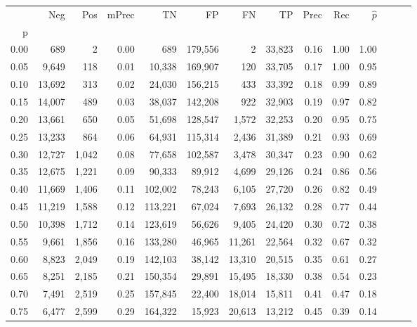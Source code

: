 \begin{tabular}{rrrrrrrrrrrrrr}
\toprule
{} &     Neg &    Pos & mPrec &       TN &       FP &      FN &      TP &  Prec &   Rec & $\hat{p}$ \\
p    &         &        &       &          &          &         &         &       &       &           \\
\midrule
0.00 &     689 &      2 &  0.00 &      689 &  179,556 &       2 &  33,823 &  0.16 &  1.00 &      1.00 \\
0.05 &   9,649 &    118 &  0.01 &   10,338 &  169,907 &     120 &  33,705 &  0.17 &  1.00 &      0.95 \\
0.10 &  13,692 &    313 &  0.02 &   24,030 &  156,215 &     433 &  33,392 &  0.18 &  0.99 &      0.89 \\
0.15 &  14,007 &    489 &  0.03 &   38,037 &  142,208 &     922 &  32,903 &  0.19 &  0.97 &      0.82 \\
0.20 &  13,661 &    650 &  0.05 &   51,698 &  128,547 &   1,572 &  32,253 &  0.20 &  0.95 &      0.75 \\
0.25 &  13,233 &    864 &  0.06 &   64,931 &  115,314 &   2,436 &  31,389 &  0.21 &  0.93 &      0.69 \\
0.30 &  12,727 &  1,042 &  0.08 &   77,658 &  102,587 &   3,478 &  30,347 &  0.23 &  0.90 &      0.62 \\
0.35 &  12,675 &  1,221 &  0.09 &   90,333 &   89,912 &   4,699 &  29,126 &  0.24 &  0.86 &      0.56 \\
0.40 &  11,669 &  1,406 &  0.11 &  102,002 &   78,243 &   6,105 &  27,720 &  0.26 &  0.82 &      0.49 \\
0.45 &  11,219 &  1,588 &  0.12 &  113,221 &   67,024 &   7,693 &  26,132 &  0.28 &  0.77 &      0.44 \\
0.50 &  10,398 &  1,712 &  0.14 &  123,619 &   56,626 &   9,405 &  24,420 &  0.30 &  0.72 &      0.38 \\
0.55 &   9,661 &  1,856 &  0.16 &  133,280 &   46,965 &  11,261 &  22,564 &  0.32 &  0.67 &      0.32 \\
0.60 &   8,823 &  2,049 &  0.19 &  142,103 &   38,142 &  13,310 &  20,515 &  0.35 &  0.61 &      0.27 \\
0.65 &   8,251 &  2,185 &  0.21 &  150,354 &   29,891 &  15,495 &  18,330 &  0.38 &  0.54 &      0.23 \\
0.70 &   7,491 &  2,519 &  0.25 &  157,845 &   22,400 &  18,014 &  15,811 &  0.41 &  0.47 &      0.18 \\
0.75 &   6,477 &  2,599 &  0.29 &  164,322 &   15,923 &  20,613 &  13,212 &  0.45 &  0.39 &      0.14 \\

\end{tabular}
